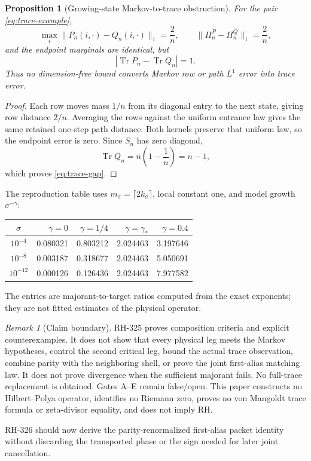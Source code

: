 \documentclass[11pt]{article}
\newtheorem{proposition}[theorem]{Proposition}
\theoremstyle{remark}
\newtheorem{remark}[theorem]{Remark}
\newcommand{\Tr}{\operatorname{Tr}}
\begin{document}
\begin{proposition}[Growing-state Markov-to-trace obstruction]
\label{prop:trace-counterexample}
For the pair \eqref{eq:trace-example},
\begin{equation}
 \max_i\|P_n(i,\cdot)-Q_n(i,\cdot)\|_1=\frac2n,
 \qquad
 \|\Pi_n^P-\Pi_n^Q\|_1=\frac2n,
 \label{eq:row-path-small}
\end{equation}
and the endpoint marginals are identical, but
\begin{equation}
 |\Tr P_n-\Tr Q_n|=1.
 \label{eq:trace-gap}
\end{equation}
Thus no dimension-free bound converts Markov row or path $L^1$ error into
trace error.
\end{proposition}

\medskip
\begin{proof}
Each row moves mass $1/n$ from its diagonal entry to the next state, giving
row distance $2/n$.  Averaging the rows against the uniform entrance law
gives the same retained one-step path distance.  Both kernels preserve that
uniform law, so the endpoint error is zero.  Since $S_n$ has zero diagonal,
\[
 \Tr Q_n=n\left(1-\frac1n\right)=n-1,
\]
which proves \eqref{eq:trace-gap}.
\end{proof}

The reproduction table uses $m_\sigma=\lceil2k_\sigma\rceil$, local constant
one, and model growth $\sigma^{-\gamma}$:
\begin{center}\small
\begin{tabular}{c@{\quad}rrrr}
\toprule
$\sigma$ & $\gamma=0$ & $\gamma=1/4$ & $\gamma=\gamma_*$ & $\gamma=0.4$\\
\midrule
$10^{-4}$  &0.080321&0.803212&2.024463&3.197646\\
$10^{-8}$  &0.003187&0.318677&2.024463&5.050691\\
$10^{-12}$ &0.000126&0.126436&2.024463&7.977582\\
\bottomrule
\end{tabular}
\end{center}
The entries are majorant-to-target ratios computed from the exact exponents;
they are not fitted estimates of the physical operator.

\begin{remark}[Claim boundary]
RH-325 proves composition criteria and explicit counterexamples.  It does
not show that every physical leg meets the Markov hypotheses, control the
second critical leg, bound the actual trace observation, combine parity with
the neighboring shell, or prove the joint first-alias matching law.  It
does not prove divergence when the sufficient majorant fails.  No full-trace
replacement is obtained.  Gates A--E remain false/open.  This paper
constructs no Hilbert--Polya operator, identifies no Riemann zero, proves no
von Mangoldt trace formula or zeta-divisor equality, and does not imply RH.
\end{remark}

RH-326 should now derive the parity-renormalized first-alias packet identity
without discarding the transported phase or the sign needed for later joint
cancellation.
\end{document}
